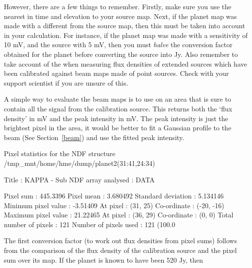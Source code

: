 \documentclass[11pt,noabs]{starlink}
\begin{document}
   However, there are a few things to remember. Firstly, make sure you
   use the nearest
   in time and elevation to your source map. Next, if the planet map was
   made with a different
   from the source map, then this must be taken into account in your
   calculation. For instance, if the planet map was made with a
   sensitivity of 10 mV, and the source with 5 mV, then you must
   \textit{halve\/} the conversion factor obtained for the planet before
   converting the source into Jy. Also remember to take account of the
   when measuring flux densities of extended
   sources which have been calibrated against beam maps made of point
   sources. Check with your support scientist if you are unsure of this.



   A simple way to evaluate the beam maps is to use
\texttt{}
   on an area that is sure to contain all the signal from the
   calibration source. This returns both the `flux density' in mV and
   the peak intensity in mV. The peak intensity is just the brightest
   pixel in the area, it would be better to
   fit a Gaussian profile to the beam
(See Section~\ref{beam})
   and use the fitted peak intensity.

\begin{terminalv}

  Pixel statistics for the NDF structure
  /tmp_mnt/home/hme/dump/planet2(31:41,24:34)

     Title                     : KAPPA - Sub
     NDF array analysed        : DATA

        Pixel sum              : 445.3396
        Pixel mean             : 3.680492
        Standard deviation     : 5.134146
        Minimum pixel value    : -3.51409
           At pixel            : (31, 25)
           Co-ordinate         : (-20, -16)
        Maximum pixel value    : 21.22465
           At pixel            : (36, 29)
           Co-ordinate         : (0, 0)
        Total number of pixels : 121
        Number of pixels used  : 121 (100.0%
\end{terminalv}

   The first conversion factor (to work out flux densities from pixel
   sums) follows from the comparison of the flux density of the
   calibration source and the pixel sum over its map. If the planet is
   known to have been 520 Jy, then
\end{document}
